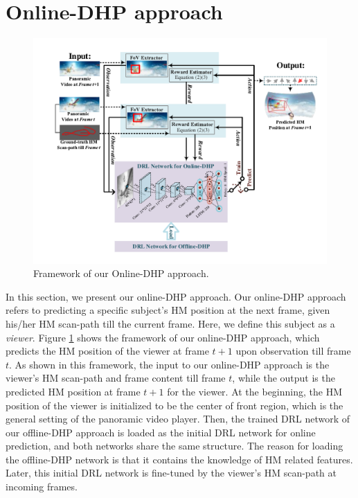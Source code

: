 \documentclass[10pt,journal,compsoc]{IEEEtran}
\begin{document}
\section{Online-DHP approach}

\begin{figure}
	\begin{center}
		\centerline{\includegraphics[width=\columnwidth]{figures/dhp_approach_on_line/whole_framework_online_5}}%
		\caption{\footnotesize{Framework of our Online-DHP approach.}}
		\label{online-framework}
	\end{center}
\end{figure}

In this section, we present our online-DHP approach.
Our online-DHP approach refers to predicting a specific subject's HM position at the next frame, given his/her HM scan-path till the current frame.
Here, we define this subject as a \textit{viewer}. %
Figure \ref{online-framework} shows the framework of our online-DHP approach, which predicts the HM position of the viewer at frame $t+1$ upon observation till frame $t$.
As shown in this framework, the input to our online-DHP approach is the viewer's HM scan-path and frame content till frame $t$, while the output is the predicted HM position at frame $t+1$ for the viewer.
At the beginning, the HM position of the viewer is initialized to be the center of front region, which is the general setting of  the panoramic video player.
Then, the trained DRL network of our offline-DHP approach is loaded as the initial DRL network for online prediction, and both networks share the same structure.
The reason for loading the offline-DHP network is that it contains the knowledge of HM related features.
Later, this initial DRL network is fine-tuned by the viewer's HM scan-path at incoming frames.
\end{document}
